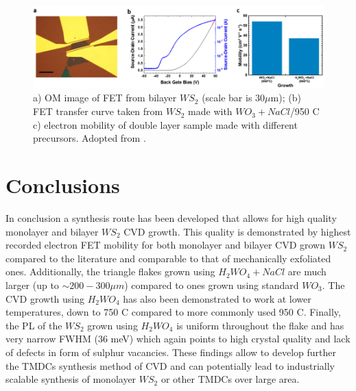 \begin{figure}[h]
	\begin{center}
		\includegraphics[scale=0.4]{PaperElectricalMeasurementBilayer.png}
		\caption{a) OM image of FET from bilayer $WS_2$ (scale bar is 30$\mu$m); (b) FET transfer curve taken from $WS_2$ made with $WO_3+NaCl$/950 {\degree}C c) electron mobility of double layer sample made with different precursors. Adopted from \cite{Reale2017}.}
		\label{fig:PaperElectricalMeasurementBilayer}
	\end{center}
\end{figure}

\section{Conclusions}

In conclusion a synthesis route has been developed that allows for high quality monolayer and bilayer $WS_2$ CVD growth. This quality is demonstrated by highest recorded electron FET mobility for both monolayer and bilayer CVD grown $WS_2$ compared to the literature and comparable to that of mechanically exfoliated ones. Additionally, the triangle flakes grown using $H_2WO_4 + NaCl$ are much larger (up to $\sim 200-300 {\mu}m$) compared to ones grown using standard $WO_3$. The CVD growth using $H_2WO_4$ has also been demonstrated to work at lower temperatures, down to 750 {\degree}C compared to more commonly used 950 {\degree}C. Finally, the PL of the $WS_2$ grown using $H_2WO_4$ is uniform throughout the flake and has very narrow FWHM (36 meV) which again points to high crystal quality and lack of defects in form of sulphur vacancies. These findings allow to develop further the TMDCs synthesis method of CVD and can potentially lead to industrially scalable synthesis of monolayer $WS_2$ or other TMDCs over large area.
